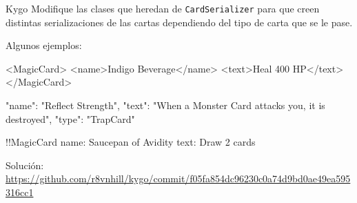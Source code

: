   \begin{ejercicio}{Kygo}
    Modifique las clases que heredan de \texttt{CardSerializer} para que creen distintas
    serializaciones de las cartas dependiendo del tipo de carta que se le pase.

    Algunos ejemplos:
    \begin{xml}
      <MagicCard>
        <name>Indigo Beverage</name>
        <text>Heal 400 HP</text>
      </MagicCard>
    \end{xml}

    \begin{json}
      {
        "name": "Reflect Strength",
        "text": "When a Monster Card attacks you, it is destroyed",
        "type": "TrapCard"
      }
    \end{json}

    \begin{yaml}
      !!MagicCard
      name: Saucepan of Avidity
      text: Draw 2 cards
    \end{yaml}

    {\footnotesize
      Solución: \url{https://github.com/r8vnhill/kygo/commit/f05fa854dc96230c0a74d9bd0ae49ea595316cc1}
    }
  \end{ejercicio}